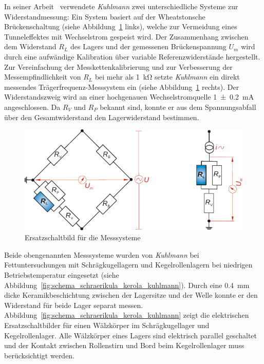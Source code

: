 In seiner Arbeit~\cite{kuhlmann_2009} verwendete \textit{Kuhlmann} zwei unterschiedliche Systeme zur Widerstandmessung:
Ein System basiert auf der Wheatstonsche Brückenschaltung (siehe Abbildung~\ref{fig:ersatzschaltbild_messsysteme_kuhlmann} links), welche zur Vermeidung eines Tunneleffektes mit Wechselstrom gespeist wird.
Der Zusammenhang zwischen dem Widerstand $R_L$ des Lagers und der gemessenen Brückenspannung $U_m$ wird durch eine aufwändige Kalibration über variable Referenzwiderstände hergestellt.
Zur Vereinfachung der Messkettenkalibrierung und zur Verbesserung der Messempfindlichkeit von $R_L$ bei mehr als \SI{1}{\kilo\ohm} setzte \textit{Kuhlmann} ein direkt messendes Trägerfrequenz-Messsystem ein (siehe Abbildung~\ref{fig:ersatzschaltbild_messsysteme_kuhlmann} rechts).
Der Widerstandszweig wird an einer hochgenauen Wechselstromquelle \SI[separate-uncertainty]{1 +- 0.2}{\milli\ampere} angeschlossen.
Da $R_V$ und $R_P$ bekannt sind, konnte er aus dem Spannungsabfall über den Gesamtwiderstand den Lagerwiderstand bestimmen.

\begin{figure}[htb]
    \centering
    \includegraphics[]{./images/ersatzschaltbild_kuhlmann.pdf}
    \caption{Ersatzschaltbild für die Messsysteme~\cite{kuhlmann_2009}}
    \label{fig:ersatzschaltbild_messsysteme_kuhlmann}
\end{figure}

Beide obengenannten Messsysteme wurden von \textit{Kuhlmann} bei Fettuntersuchungen mit Schrägkugellagern und Kegelrollenlagern bei niedrigen Betriebstemperatur eingesetzt (siehe Abbildung~\ref{fig:schema_schraerikula_kerola_kuhlmann}).
Durch eine \SI{0.4}{\milli\meter} dicke Keramikbeschichtung zwischen der Lagersitze und der Welle konnte er den Widerstand für beide Lager separat messen.
Abbildung~\ref{fig:schema_schraerikula_kerola_kuhlmann} zeigt die elektrischen Ersatzschaltbilder für einen Wälzkörper im Schrägkugellager und Kegelrollenlager.
Alle Wälzkörper eines Lagers sind elektrisch parallel geschaltet und der Kontakt zwischen Rollenstirn und Bord beim Kegelrollenlager muss berücksichtigt werden.

